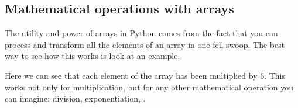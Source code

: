\documentclass[letterpaper,10pt,english]{sphinxmanual}
\begin{document}
\subsection{Mathematical operations with arrays}
\label{\detokenize{chap3/chap3_arrays:mathematical-operations-with-arrays}}
\sphinxAtStartPar
The utility and power of arrays in Python comes from the fact that you can process and transform all the elements of an array in one fell swoop.  The best way to see how this works is look at an example.

\begin{sphinxVerbatim}[commandchars=\\\{\},numbers=left,firstnumber=1,stepnumber=1]
    

\PYG{p}{[}      \PYG{p}{]}

\PYG{p}{[}         \PYG{p}{]}
\end{sphinxVerbatim}

\sphinxAtStartPar
Here we can see that each element of the array has been multiplied by 6.  This works not only for multiplication, but for any other mathematical operation you can imagine: division, exponentiation, .
\end{document}
